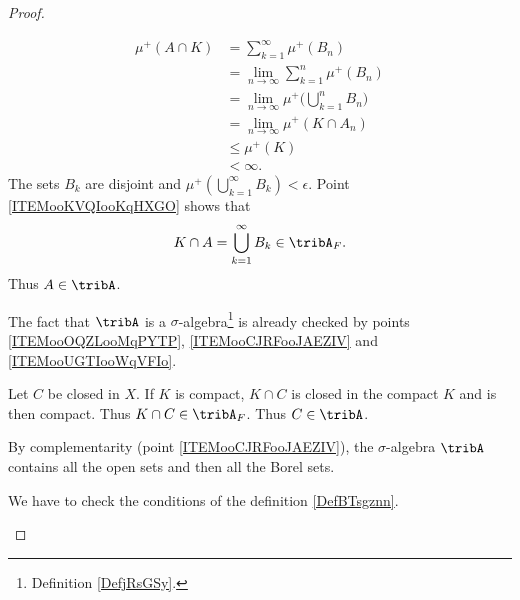 \begin{proof}
\begin{subproof}
\begin{subequations}
\begin{align}
                \mu^+(A\cap K)&=\sum_{k=1}^{\infty}\mu^+(B_n)\\
                &=\lim_{n\to \infty} \sum_{k=1}^n\mu^+(B_n)\\
                &=\lim_{n\to \infty} \mu^+\big( \bigcup_{k=1}^nB_n \big)\\
                &=\lim_{n\to \infty} \mu^+(K\cap A_n)\\
                &\leq \mu^+(K)\\
                &<\infty.
                \end{align}
            \end{subequations}
            The sets \( B_k\) are disjoint and \( \mu^+(\bigcup_{k=1}^{\infty}B_k)<\epsilon\). Point \ref{ITEMooKVQIooKqHXGO} shows that
            \begin{equation}
                K\cap A=\bigcup_{k=1}^{\infty}B_k\in\tribA_F.
            \end{equation}
            Thus \( A\in \tribA\).

             
            The fact that \( \tribA\) is a \( \sigma\)-algebra\footnote{Definition \ref{DefjRsGSy}.} is already checked by points \ref{ITEMooOQZLooMqPYTP}, \ref{ITEMooCJRFooJAEZIV} and \ref{ITEMooUGTIooWqVFIo}.

            Let \( C\) be closed in \( X\). If \( K\) is compact, \( K\cap C\) is closed in the compact \( K\) and is then compact. Thus \( K\cap C\in\tribA_F\). Thus \( C\in \tribA\).

            By complementarity (point \ref{ITEMooCJRFooJAEZIV}), the \( \sigma\)-algebra \( \tribA\) contains all the open sets and then all the Borel sets.

                
            We have to check the conditions of the definition \ref{DefBTsgznn}.


\end{subproof}
\end{proof}
